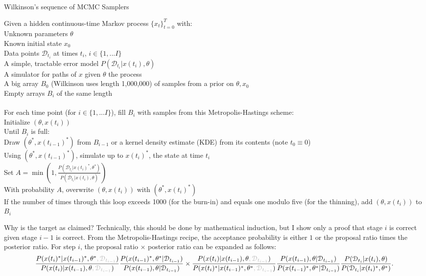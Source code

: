 \documentclass{article}
\begin{document}
\begin{algorithm}[h]
\caption{ \label{pMCMC} Wilkinson's sequence of MCMC Samplers}
Given a hidden continuous-time Markov process $\{x_t\}_{t=0}^T$ with: \\
\Indp \Indp
Unknown parameters $\theta$\\
Known initial state $x_0$\\
Data points $\mathcal{D}_{t_{i}}$ at times $t_{i}$, $i \in \{1, ... I\}$ \\
A simple, tractable error model $P(\mathcal{D}_{t_{i}}|x(t_{i}), \theta)$\\
A simulator for paths of $x$ given $\theta$ the process\\
A big array $B_0$ (Wilkinson uses length 1,000,000) of samples from a prior on $\theta, x_0$\\
Empty arrays $B_{i}$ of the same length\\
$\phantom{0}$\\
\Indm \Indm
For each time point (for $i \in \{1, ... I\}$), fill $B_{i}$ with samples from this Metropolis-Hastings scheme:\\
\Indp\Indp
Initialize $(\theta, x(t_{i}))$ \\
Until $B_{i}$ is full: \\
\Indp\Indp
Draw $(\theta^*, x(t_{i-1})^*)$ from $B_{i-1}$ or a kernel density estimate (KDE) from its contents (note $t_0\equiv0$)\\
Using $(\theta^*, x(t_{i-1})^*)$, simulate up to $x(t_{i})^*$, the state at time $t_{i}$ \\
Set $A=\min(1, \frac{P(\mathcal{D}_{t_{i}}|x(t_{i})^*, \theta^*)}{P(\mathcal{D}_{t_{i}}|x(t_{i}), \theta)})$\\
With probability $A$, overwrite $(\theta, x(t_{i}))$ with $(\theta^*, x(t_{i})^*)$\\
If the number of times through this loop exceeds 1000 (for the burn-in) and equals one modulo five (for the thinning), add $(\theta, x(t_{i}))$ to $B_{i}$\\
\Indm \Indm
\end{algorithm}
\pagebreak
Why is the target as claimed? Technically, this should be done by mathematical induction, but I show only a proof that stage $i$ is correct given stage $i-1$ is correct. From the Metropolis-Hastings recipe, the acceptance probability is either $1$ or the proposal ratio times the posterior ratio. For step $i$, the proposal ratio $\times$ posterior ratio can be expanded as follows:
$$ \frac{P(x(t_{i})^*| x(t_{i-1})^*,\theta^*\gray{, \mathcal{D}_{t_{i-1}}})}{P(x(t_{i})| x(t_{i-1}), \theta \gray{, \mathcal{D}_{t_{i-1}}})} 
\frac{P(x(t_{i-1})^*,\theta^*| \mathcal{D}_{t_{i-1}})}{P(x(t_{i-1}), \theta| \mathcal{D}_{t_{i-1}})}
\times 
\frac{P(x(t_{i})| x(t_{i-1}), \theta \gray{, \mathcal{D}_{t_{i-1}}})}{P(x(t_{i})^*| x(t_{i-1})^*,\theta^*\gray{, \mathcal{D}_{t_{i-1}}})}
\frac{ P(x(t_{i-1}), \theta| \mathcal{D}_{t_{i-1}})}{ P( x(t_{i-1})^*,\theta^*| \mathcal{D}_{t_{i-1}})}   
\frac{P(\mathcal{D}_{t_{i}}|x(t_{i}), \theta)}{P(\mathcal{D}_{t_{i}}|x(t_{i})^*, \theta^*)}.$$   
\end{document}
